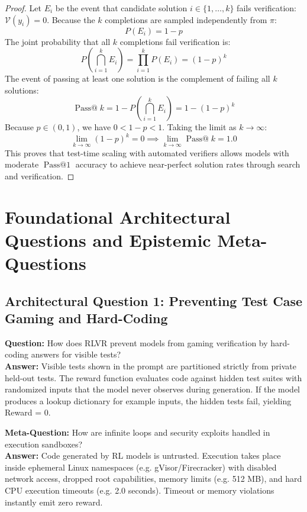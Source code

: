 \documentclass[11pt,a4paper]{article}
\theoremstyle{definition}
\begin{document}
\begin{proof}
Let $E_i$ be the event that candidate solution $i \in \{1, \dots, k\}$ fails verification: $\mathcal{V}(y_i) = 0$.
Because the $k$ completions are sampled independently from $\pi$:
{\boldmath
\begin{equation}
P(E_i) = 1 - p
\end{equation}
}
The joint probability that all $k$ completions fail verification is:
{\boldmath
\begin{equation}
P\left( \bigcap_{i=1}^k E_i \right) = \prod_{i=1}^k P(E_i) = (1 - p)^k
\end{equation}
}
The event of passing at least one solution is the complement of failing all $k$ solutions:
{\boldmath
\begin{equation}
\operatorname{Pass@}k = 1 - P\left( \bigcap_{i=1}^k E_i \right) = 1 - (1 - p)^k
\end{equation}
}
Because $p \in (0, 1)$, we have $0 < 1 - p < 1$.
Taking the limit as $k \to \infty$:
{\boldmath
\begin{equation}
\lim_{k \to \infty} (1 - p)^k = 0 \implies \lim_{k \to \infty} \operatorname{Pass@}k = 1.0
\end{equation}
}
This proves that test-time scaling with automated verifiers allows models with moderate $\operatorname{Pass@1}$ accuracy to achieve near-perfect solution rates through search and verification.
\end{proof}

\section{Foundational Architectural Questions and Epistemic Meta-Questions}

\subsection{Architectural Question 1: Preventing Test Case Gaming and Hard-Coding}
\textbf{Question:} How does RLVR prevent models from gaming verification by hard-coding answers for visible tests?\\
\textbf{Answer:} Visible tests shown in the prompt are partitioned strictly from private held-out tests. The reward function evaluates code against hidden test suites with randomized inputs that the model never observes during generation. If the model produces a lookup dictionary for example inputs, the hidden tests fail, yielding Reward = 0.

\textbf{Meta-Question:} How are infinite loops and security exploits handled in execution sandboxes?\\
\textbf{Answer:} Code generated by RL models is untrusted. Execution takes place inside ephemeral Linux namespaces (e.g. gVisor/Firecracker) with disabled network access, dropped root capabilities, memory limits (e.g. 512 MB), and hard CPU execution timeouts (e.g. 2.0 seconds). Timeout or memory violations instantly emit zero reward.
\end{document}
